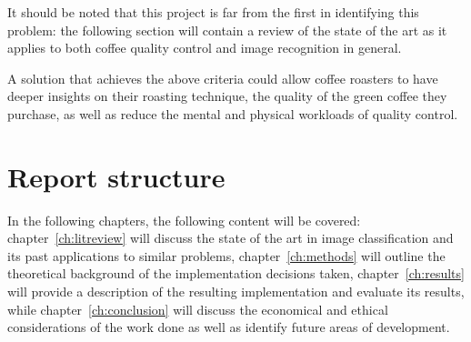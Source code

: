 It should be noted that this project is far from the first in identifying this problem:
the following section will contain a review of the state of the art as it applies to both
coffee quality control and image recognition in general.

A solution that achieves the above criteria could allow coffee roasters to have
deeper insights on their roasting technique, the quality of the green coffee they
purchase, as well as reduce the mental and physical workloads of quality control.

\section{Report structure}
\label{sec:report-structure}
In the following chapters, the following content will be covered: chapter~\ref{ch:litreview} will discuss the state of the art
in image classification and its past applications to similar problems, chapter~\ref{ch:methods} will outline the theoretical background
of the implementation decisions taken, chapter~\ref{ch:results} will provide a description of the resulting implementation and evaluate
its results, while chapter~\ref{ch:conclusion} will discuss the economical and ethical considerations of the work done as well as identify future
areas of development.